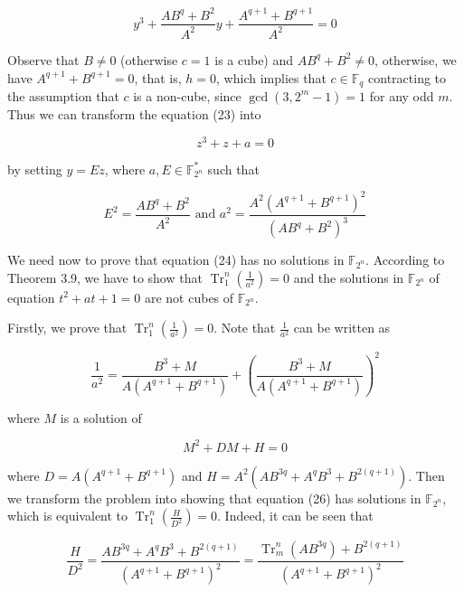 \documentclass[10pt]{article}
\begin{document}
\begin{equation*}
y^{3}+\frac{A B^{q}+B^{2}}{A^{2}} y+\frac{A^{q+1}+B^{q+1}}{A^{2}}=0 \tag{23}
\end{equation*}


Observe that $B \neq 0$ (otherwise $c=1$ is a cube) and $A B^{q}+B^{2} \neq 0$, otherwise, we have $A^{q+1}+B^{q+1}=0$, that is, $h=0$, which implies that $c \in \mathbb{F}_{q}$ contracting to the assumption that $c$ is a non-cube, since $\operatorname{gcd}\left(3,2^{m}-1\right)=1$ for any odd $m$. Thus we can transform the equation (23) into


\begin{equation*}
z^{3}+z+a=0 \tag{24}
\end{equation*}


by setting $y=E z$, where $a, E \in \mathbb{F}_{2^{n}}^{*}$ such that

$$
E^{2}=\frac{A B^{q}+B^{2}}{A^{2}} \text { and } a^{2}=\frac{A^{2}\left(A^{q+1}+B^{q+1}\right)^{2}}{\left(A B^{q}+B^{2}\right)^{3}}
$$

We need now to prove that equation (24) has no solutions in $\mathbb{F}_{2^{n}}$. According to Theorem 3.9, we have to show that $\operatorname{Tr}_{1}^{n}\left(\frac{1}{a^{2}}\right)=0$ and the solutions in $\mathbb{F}_{2^{n}}$ of equation $t^{2}+a t+1=0$ are not cubes of $\mathbb{F}_{2^{n}}$.

Firstly, we prove that $\operatorname{Tr}_{1}^{n}\left(\frac{1}{a^{2}}\right)=0$. Note that $\frac{1}{a^{2}}$ can be written as


\begin{equation*}
\frac{1}{a^{2}}=\frac{B^{3}+M}{A\left(A^{q+1}+B^{q+1}\right)}+\left(\frac{B^{3}+M}{A\left(A^{q+1}+B^{q+1}\right)}\right)^{2} \tag{25}
\end{equation*}


where $M$ is a solution of


\begin{equation*}
M^{2}+D M+H=0 \tag{26}
\end{equation*}


where $D=A\left(A^{q+1}+B^{q+1}\right)$ and $H=A^{2}\left(A B^{3 q}+A^{q} B^{3}+B^{2(q+1)}\right)$. Then we transform the problem into showing that equation (26) has solutions in $\mathbb{F}_{2^{n}}$, which is equivalent to $\operatorname{Tr}_{1}^{n}\left(\frac{H}{D^{2}}\right)=0$. Indeed, it can be seen that

$$
\frac{H}{D^{2}}=\frac{A B^{3 q}+A^{q} B^{3}+B^{2(q+1)}}{\left(A^{q+1}+B^{q+1}\right)^{2}}=\frac{\operatorname{Tr}_{m}^{n}\left(A B^{3 q}\right)+B^{2(q+1)}}{\left(A^{q+1}+B^{q+1}\right)^{2}}
$$
\end{document}
